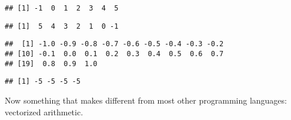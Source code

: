\documentclass[paper=a4,10pt,div=17,headsepline,BCOR=12mm,twoside,open=right]{scrbook}\usepackage{knitr}
\begin{document}
\begin{knitrout}\footnotesize
{}\color{fgcolor}\begin{kframe}
\begin{alltt}
 \hlkwb{<-} \hlopt{-}\hlopt{:}
\end{alltt}
\begin{verbatim}
## [1] -1  0  1  2  3  4  5
\end{verbatim}
\begin{alltt}
 \hlkwb{<-} \hlopt{:-}
\end{alltt}
\begin{verbatim}
## [1]  5  4  3  2  1  0 -1
\end{verbatim}
\begin{alltt}
 \hlkwb{<-} \hlstd{(} \hlstd{=} \hlopt{-}\hlstd{,}  \hlstd{=} \hlstd{,}  \hlstd{=} \hlstd{)}
\end{alltt}
\begin{verbatim}
##  [1] -1.0 -0.9 -0.8 -0.7 -0.6 -0.5 -0.4 -0.3 -0.2
## [10] -0.1  0.0  0.1  0.2  0.3  0.4  0.5  0.6  0.7
## [19]  0.8  0.9  1.0
\end{verbatim}
\begin{alltt}
 \hlkwb{<-} \hlstd{(}\hlopt{-}\hlstd{,} \hlstd{)}
\end{alltt}
\begin{verbatim}
## [1] -5 -5 -5 -5
\end{verbatim}
\end{kframe}
\end{knitrout}

Now something that makes \R different from most other programming languages: vectorized arithmetic.
\end{document}
